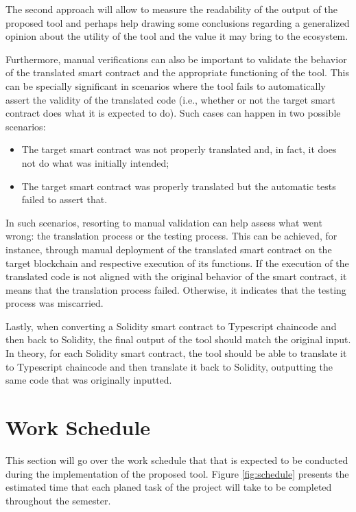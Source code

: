 \documentclass[runningheads]{llncs}
\begin{document}
The second approach will allow to measure the readability of the output of the proposed tool and perhaps help drawing some conclusions regarding a generalized opinion about the utility of the tool and the value it may bring to the ecosystem.

Furthermore, manual verifications can also be important to validate the behavior of the translated smart contract and the appropriate functioning of the tool. This can be specially significant in scenarios where the tool fails to automatically assert the validity of the translated code (i.e., whether or not the target smart contract does what it is expected to do). Such cases can happen in two possible scenarios:
\begin{itemize}
    \item The target smart contract was not properly translated and, in fact, it does not do what was initially intended;
    \item The target smart contract was properly translated but the automatic tests failed to assert that.
\end{itemize}

In such scenarios, resorting to manual validation can help assess what went wrong: the translation process or the testing process. This can be achieved, for instance, through manual deployment of the translated smart contract on the target blockchain and respective execution of its functions. If the execution of the translated code is not aligned with the original behavior of the smart contract, it means that the translation process failed. Otherwise, it indicates that the testing process was miscarried.

Lastly, when converting a Solidity smart contract to Typescript chaincode and then back to Solidity, the final output of the tool should match the original input. In theory, for each Solidity smart contract, the tool should be able to translate it to Typescript chaincode and then translate it back to Solidity, outputting the same code that was originally inputted.


\section{Work Schedule} \label{schedule}

This section will go over the work schedule that  that is expected to be conducted during the implementation of the proposed tool. Figure \ref{fig:schedule} presents the estimated time that each planed task of the project will take to be completed throughout the semester.
\end{document}
